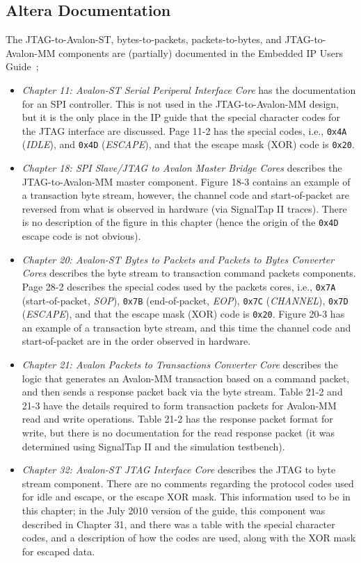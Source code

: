 \documentclass[10pt,twoside]{article}
\begin{document}
\clearpage
\subsection{Altera Documentation}

The JTAG-to-Avalon-ST, bytes-to-packets, packets-to-bytes, and
JTAG-to-Avalon-MM components are (partially) documented in the 
Embedded IP Users Guide~\cite{Altera_Embedded_IP_2011};
%
\begin{itemize}
\item {\em Chapter 11: Avalon-ST Serial Periperal Interface Core}
has the documentation for an SPI controller. This is not used in the
JTAG-to-Avalon-MM design, but it is the only place in the IP guide that
the special character codes for the JTAG interface are discussed.
Page 11-2 has the special codes, i.e., \verb+0x4A+ ({\em IDLE}),
and \verb+0x4D+ ({\em ESCAPE}), and that the escape mask (XOR) code 
is \verb+0x20+.
\item {\em Chapter 18: SPI Slave/JTAG to Avalon Master Bridge Cores} 
describes the JTAG-to-Avalon-MM master component. Figure 18-3 contains an example of
a transaction byte stream, however, the channel code and start-of-packet are
reversed from what is observed in hardware (via SignalTap II traces).
There is no description of the figure in this chapter (hence the origin
of the \verb+0x4D+ escape code is not obvious).
\item {\em Chapter 20: Avalon-ST Bytes to Packets and Packets to Bytes Converter Cores}
describes the byte stream to transaction command packets components.
Page 28-2 describes the special codes used by the packets cores,
i.e., \verb+0x7A+ (start-of-packet, {\em SOP}), \verb+0x7B+ (end-of-packet,
{\em EOP}), \verb+0x7C+ ({\em CHANNEL}), \verb+0x7D+ ({\em ESCAPE}),
and that the escape mask (XOR) code is \verb+0x20+. Figure 20-3 has an example
of a transaction byte stream, and this time the channel code and start-of-packet
are in the order observed in hardware.
\item {\em Chapter 21: Avalon Packets to Transactions Converter Core}
describes the logic that generates an Avalon-MM transaction based on
a command packet, and then sends a response packet back via the byte stream.
Table 21-2 and 21-3 have the details required to form transaction packets
for Avalon-MM read and write operations.
Table 21-2 has the response packet format for write, but there is no documentation
for the read response packet (it was determined using SignalTap II
and the simulation testbench).
\item {\em Chapter 32: Avalon-ST JTAG Interface Core} describes the JTAG to
byte stream component. There are no comments regarding the protocol 
codes used for idle and escape, or the escape XOR mask.
This information used to be in this chapter; in the July 2010 version
of the guide, this component was described in Chapter 31, and there
was a table with the special character codes, and a description of how
the codes are used, along with the XOR mask for escaped data.
\end{itemize}
\end{document}
